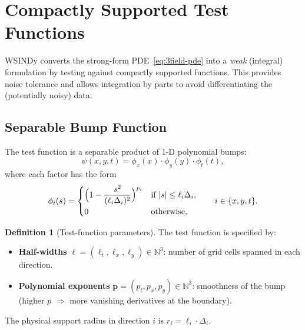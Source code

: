 \documentclass[11pt, letterpaper]{article}
\theoremstyle{definition}
\newtheorem{definition}{Definition}[section]
\newcommand{\N}{\mathbb{N}}
\begin{document}
\section{Compactly Supported Test Functions}
\label{sec:test-functions}

WSINDy converts the strong-form PDE~\eqref{eq:3field-pde} into a
\emph{weak} (integral) formulation by testing against compactly
supported functions.  This provides noise tolerance and allows
integration by parts to avoid differentiating the (potentially noisy)
data.

\subsection{Separable Bump Function}
\label{sec:bump}

The test function is a separable product of 1-D polynomial bumps:
\begin{equation}
\label{eq:psi-sep}
  \psi(x, y, t)
  = \phi_x(x) \cdot \phi_y(y) \cdot \phi_t(t),
\end{equation}
where each factor has the form
\begin{equation}
\label{eq:phi-1d}
  \phi_i(s)
  = \begin{cases}
      \Bigl(1 - \dfrac{s^{2}}{(\ell_i \Delta_i)^{2}}\Bigr)^{p_i}
      & \text{if } |s| \le \ell_i \Delta_i, \\[6pt]
      0 & \text{otherwise},
    \end{cases}
  \qquad i \in \{x, y, t\}.
\end{equation}

\begin{definition}[Test-function parameters]
\label{def:psi-params}
The test function is specified by:
\begin{itemize}[nosep]
  \item \textbf{Half-widths} $\bm{\ell} = (\ell_t, \ell_x, \ell_y) \in \N^{3}$:
    number of grid cells spanned in each direction.
  \item \textbf{Polynomial exponents} $\mathbf{p} = (p_t, p_x, p_y) \in \N^{3}$:
    smoothness of the bump (higher $p$ $\Rightarrow$ more vanishing
    derivatives at the boundary).
\end{itemize}
The physical support radius in direction $i$ is
$r_i = \ell_i \cdot \Delta_i$.
\end{definition}
\end{document}
